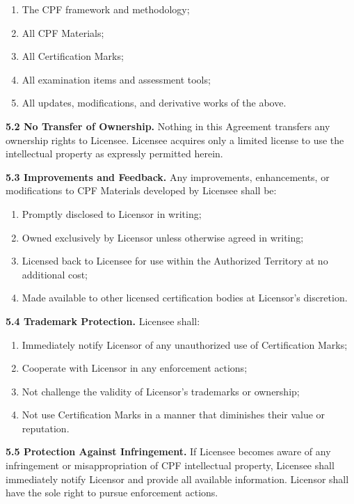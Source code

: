 \documentclass[11pt,a4paper]{article}
\begin{document}
\begin{enumerate}[label=\alph*)]
\item The CPF framework and methodology;
\item All CPF Materials;
\item All Certification Marks;
\item All examination items and assessment tools;
\item All updates, modifications, and derivative works of the above.
\end{enumerate}

\textbf{5.2 No Transfer of Ownership.} Nothing in this Agreement transfers any ownership rights to Licensee. Licensee acquires only a limited license to use the intellectual property as expressly permitted herein.

\textbf{5.3 Improvements and Feedback.} Any improvements, enhancements, or modifications to CPF Materials developed by Licensee shall be:

\begin{enumerate}[label=\alph*)]
\item Promptly disclosed to Licensor in writing;
\item Owned exclusively by Licensor unless otherwise agreed in writing;
\item Licensed back to Licensee for use within the Authorized Territory at no additional cost;
\item Made available to other licensed certification bodies at Licensor's discretion.
\end{enumerate}

\textbf{5.4 Trademark Protection.} Licensee shall:

\begin{enumerate}[label=\alph*)]
\item Immediately notify Licensor of any unauthorized use of Certification Marks;
\item Cooperate with Licensor in any enforcement actions;
\item Not challenge the validity of Licensor's trademarks or ownership;
\item Not use Certification Marks in a manner that diminishes their value or reputation.
\end{enumerate}

\textbf{5.5 Protection Against Infringement.} If Licensee becomes aware of any infringement or misappropriation of CPF intellectual property, Licensee shall immediately notify Licensor and provide all available information. Licensor shall have the sole right to pursue enforcement actions.
\end{document}
